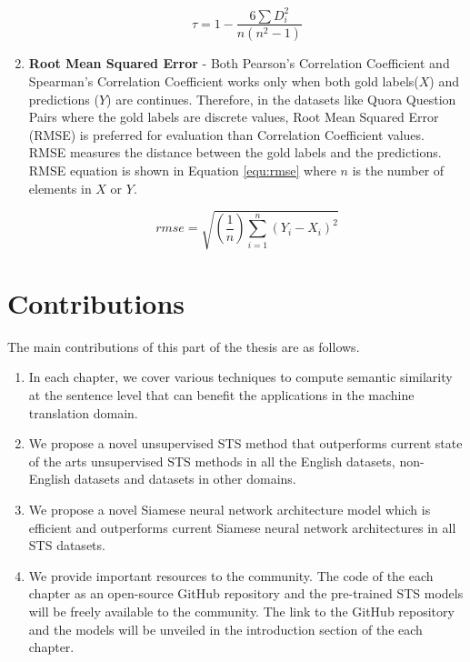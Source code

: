 \begin{enumerate}
	
	\begin{equation}
	\label{equ:spearman}
	\tau = 1- {\frac {6 \sum D_i^2}{n(n^2 - 1)}}
	\end{equation}
	
	
	\item \textbf{Root Mean Squared Error} - Both Pearson's Correlation Coefficient and Spearman's Correlation Coefficient works only when both gold labels($X$) and predictions ($Y$) are continues. Therefore, in the datasets like Quora Question Pairs where the gold labels are discrete values, Root Mean Squared Error (RMSE) is preferred for evaluation than Correlation Coefficient values. RMSE measures the distance between the gold labels and the predictions. RMSE equation is shown in Equation \ref{equ:rmse} where $n$ is the number of elements in $X$ or $Y$. 
	
	\begin{equation}
	\label{equ:rmse}
	rmse = \sqrt{(\frac{1}{n})\sum_{i=1}^{n}(Y_{i} - X_{i})^{2}}
	\end{equation}
	
\end{enumerate}


\section{Contributions}
\label{sec:sts_intro_contribution}
The main contributions of this part of the thesis are as follows.

\begin{enumerate}
	\item In each chapter, we cover various techniques to compute semantic similarity at the sentence level that can benefit the applications in the machine translation domain. 
	
	\item We propose a novel unsupervised STS method that outperforms current state of the arts unsupervised STS methods in all the English datasets, non-English datasets and datasets in other domains. 
	
	\item We propose a novel Siamese neural network architecture model which is efficient and outperforms current Siamese neural network architectures in all STS datasets. 
	
	\item We provide important resources to the community. The code of the each chapter as an open-source GitHub repository and the pre-trained STS models will be freely available to the community. The link to the GitHub repository and the models will be unveiled in the introduction section of the each chapter. 
\end{enumerate}
